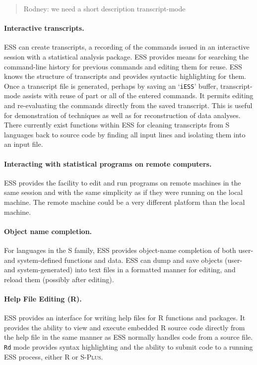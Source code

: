 \documentclass{article}
\newcommand*{\Splus}{\textsc{S-Plus}}
\newcommand{\stexttt}[1]{{\small\texttt{#1}}}
\newcommand{\file}[1]{`\stexttt{#1}'}
\begin{document}
\begin{quote}
 Rodney:  we need a short description transcript-mode
\end{quote}

\paragraph{Interactive transcripts.}
ESS can create transcripts, a recording of the commands issued in an
interactive session with a statistical analysis package.
ESS provides means for searching
the command-line history for previous commands and editing them for
reuse.  ESS knows the structure of transcripts and provides
syntactic highlighting for them.
Once a transcript file is generated, perhaps by saving an \file{iESS}
buffer, transcript-mode assists with reuse of part or all of the
entered commands.  It permits editing and re-evaluating the commands
directly from the saved transcript.  This is useful for
demonstration of techniques as well as for reconstruction of data
analyses.  There currently exist functions within ESS for cleaning
transcripts from S languages back to source code by finding all input
lines and isolating them into an input file.



\paragraph{Interacting with statistical programs on remote computers.}
ESS provides the facility to edit and run programs on remote machines
in the same session and with the same simplicity as if they were
running on the local machine.  The remote machine could be a very
different platform than the local machine.

\paragraph{Object name completion.}
For languages in the S family,
ESS provides object-name completion of both user- and
system-defined functions and data.  ESS can dump and save objects
(user- and system-generated) into text files in a formatted manner for
editing, and reload them (possibly after editing).

\paragraph{Help File Editing (R).}
ESS provides an interface for writing help files for R functions
and packages.  It provides the ability to view and execute embedded R
source code directly from the help file in the same manner as ESS
normally handles code from a source file.  \stexttt{Rd} mode provides
syntax highlighting and the ability to submit code to a running ESS
process, either R or \Splus.
\end{document}
